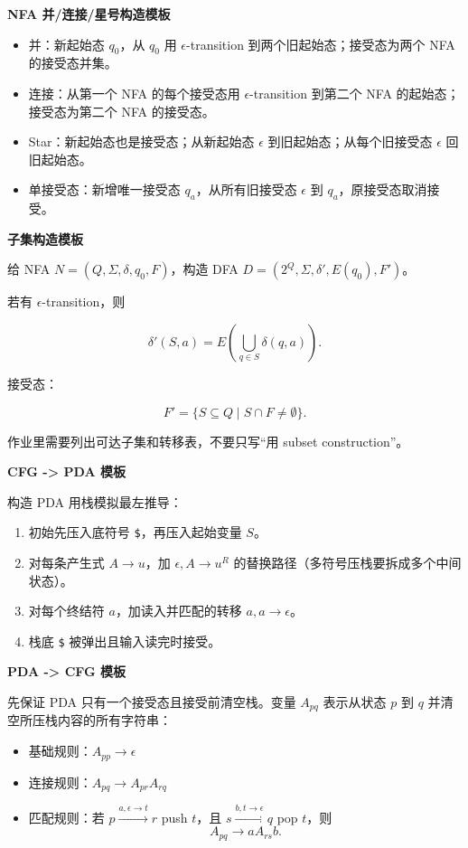 ﻿\documentclass[UTF8,11pt]{ctexart}
\begin{document}
\textbf{NFA 并/连接/星号构造模板}


\begin{itemize}
\item 并：新起始态 \(q_0\)，从 \(q_0\) 用 \(\epsilon\)-transition 到两个旧起始态；接受态为两个 NFA 的接受态并集。
\item 连接：从第一个 NFA 的每个接受态用 \(\epsilon\)-transition 到第二个 NFA 的起始态；接受态为第二个 NFA 的接受态。
\item Star：新起始态也是接受态；从新起始态 \(\epsilon\) 到旧起始态；从每个旧接受态 \(\epsilon\) 回旧起始态。
\item 单接受态：新增唯一接受态 \(q_a\)，从所有旧接受态 \(\epsilon\) 到 \(q_a\)，原接受态取消接受。
\end{itemize}


\textbf{子集构造模板}


给 NFA \(N=(Q,\Sigma,\delta,q_0,F)\)，构造 DFA \(D=(2^Q,\Sigma,\delta',E(q_0),F')\)。  

若有 \(\epsilon\)-transition，则

\[
\delta'(S,a)=E\left(\bigcup_{q\in S}\delta(q,a)\right).
\]

接受态：

\[
F'=\{S\subseteq Q\mid S\cap F\neq\emptyset\}.
\]

作业里需要列出可达子集和转移表，不要只写“用 subset construction”。


\textbf{CFG -> PDA 模板}


构造 PDA 用栈模拟最左推导：


\begin{enumerate}
\item 初始先压入底符号 \texttt{\$}，再压入起始变量 \(S\)。
\item 对每条产生式 \(A\to u\)，加 \(\epsilon,A\to u^R\) 的替换路径（多符号压栈要拆成多个中间状态）。
\item 对每个终结符 \(a\)，加读入并匹配的转移 \(a,a\to\epsilon\)。
\item 栈底 \texttt{\$} 被弹出且输入读完时接受。
\end{enumerate}


\textbf{PDA -> CFG 模板}


先保证 PDA 只有一个接受态且接受前清空栈。变量 \(A_{pq}\) 表示从状态 \(p\) 到 \(q\) 并清空所压栈内容的所有字符串：


\begin{itemize}
\item 基础规则：\(A_{pp}\to\epsilon\)
\item 连接规则：\(A_{pq}\to A_{pr}A_{rq}\)
\item 匹配规则：若 \(p\xrightarrow{a,\epsilon\to t}r\) push \(t\)，且 \(s\xrightarrow{b,t\to\epsilon}q\) pop \(t\)，则
\[
  A_{pq}\to aA_{rs}b.
  \]

\end{itemize}
\end{document}
